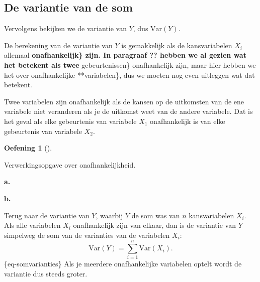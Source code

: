 \documentclass[
  a4paper,
]{scrbook}
\theoremstyle{definition}
\newtheorem{exercise}{Oefening}[chapter]
\theoremstyle{definition}
\theoremstyle{remark}
\begin{document}
\subsection{De variantie van de som}\label{de-variantie-van-de-som}

Vervolgens bekijken we de variantie van \(Y\), dus
\(\mathrm{Var}\!\left(Y\right)\).

De berekening van de variantie van \(Y\) is gemakkelijk als de
kansvariabelen \(X_i\) allemaal \textbf{onafhankelijk\} zijn. In
paragraaf ?? hebben we al gezien wat het betekent als twee
}gebeurtenissen\} onafhankelijk zijn, maar hier hebben we het over
onafhankelijke **variabelen\}, dus we moeten nog even uitleggen wat dat
betekent.

Twee variabelen zijn onafhankelijk als de kansen op de uitkomsten van de
ene variabele niet veranderen als je de uitkomst weet van de andere
variabele. Dat is het geval als elke gebeurtenis van variabele \(X_1\)
onafhankelijk is van elke gebeurtenis van variabele \(X_2\).

\begin{exercise}[]\protect\hypertarget{exr-onafhankelijk}{}\label{exr-onafhankelijk}

Verwerkingsopgave over onafhankelijkheid.

\textbf{a.}

\textbf{b.}

\end{exercise}

Terug naar de variantie van \(Y\), waarbij \(Y\) de som was van \(n\)
kansvariabelen \(X_i\). Als alle variabelen \(X_i\) onafhankelijk zijn
van elkaar, dan is de variantie van \(Y\) simpelweg de som van de
varianties van de variabelen \(X_i\): \[
\mathrm{Var}\!\left(Y\right) = \sum_{i = 1}^n \mathrm{Var}\!\left(X_i\right).
\] \{eq-somvarianties\} Als je meerdere onafhankelijke variabelen optelt
wordt de variantie dus steeds groter.
\end{document}
